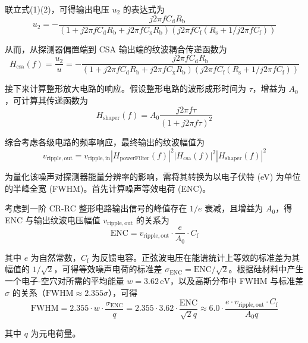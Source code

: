 \documentclass[12pt,fontset=fandol]{ctexart}
\begin{document}
联立式(1)(2)，可得输出电压 $u_2$ 的表达式为
\begin{equation}
u_2 = - \frac{j2\pi f C_{\mathrm{d}} R_{\mathrm{b}}}{(1 + j2\pi f C_{\mathrm{d}} R_{\mathrm{b}} + j2\pi f C_{\mathrm{x}} R_{\mathrm{b}})(j2\pi f C_{\mathrm{f}}(R_{\mathrm{s}} + 1/j2\pi f C_{\mathrm{f}}))}
\end{equation}

从而，从探测器偏置端到 CSA 输出端的纹波耦合传递函数为
\begin{equation}
H_{\mathrm{csa}}(f) = \frac{u_2}{u} = - \frac{j2\pi f C_{\mathrm{d}} R_{\mathrm{b}}}{(1 + j2\pi f C_{\mathrm{d}} R_{\mathrm{b}} + j2\pi f C_{\mathrm{x}} R_{\mathrm{b}})(j2\pi f C_{\mathrm{f}}(R_{\mathrm{s}} + 1/j2\pi f C_{\mathrm{f}}))}
\end{equation}

接下来计算整形放大电路的响应。假设整形电路的波形成形时间为 $\tau$，增益为 $A_0$，可计算其传递函数为
\begin{equation}
H_{\mathrm{shaper}}(f) = A_0 \frac{j2\pi f \tau}{(1 + j2\pi f \tau)^2}
\end{equation}

综合考虑各级电路的频率响应，最终输出的纹波幅值为
\begin{equation}
v_{\mathrm{ripple,out}} = v_{\mathrm{ripple,in}} |H_{\mathrm{powerFilter}}(f)|^2 |H_{\mathrm{csa}}(f)|^2 |H_{\mathrm{shaper}}(f)|^2
\end{equation}

\begin{graycommentblock}
为量化该噪声对探测器能量分辨率的影响，需将其转换为以电子伏特 (eV) 为单位的半峰全宽 (FWHM)\cite{ref14}。首先计算噪声等效电荷 (ENC)。

考虑到一阶 CR-RC 整形电路输出信号的峰值存在 $1/e$ 衰减，且增益为 $A_0$，得 ENC 与输出纹波电压幅值 $v_{\mathrm{ripple,out}}$ 的关系为
\begin{equation}
\mathrm{ENC} = v_{\mathrm{ripple,out}} \cdot \frac{e}{A_0} \cdot C_{\mathrm{f}}
\end{equation}

其中 $e$ 为自然常数，$C_{\mathrm{f}}$ 为反馈电容。正弦波电压在能谱统计上等效的标准差为其幅值的 $1/\sqrt{2}$，可得等效噪声电荷的标准差 $\sigma_{\mathrm{ENC}} = \mathrm{ENC}/\sqrt{2}$。根据硅材料中产生一个电子-空穴对所需的平均能量 $w = 3.62\,\mathrm{eV}$，以及高斯分布中 FWHM 与标准差 $\sigma$ 的关系（$\mathrm{FWHM} \approx 2.355\sigma$），可得
\begin{equation}
\mathrm{FWHM} = 2.355 \cdot w \cdot \frac{\sigma_{\mathrm{ENC}}}{q}
= 2.355 \cdot 3.62 \cdot \frac{\mathrm{ENC}}{\sqrt{2} q}
\approx 6.0 \cdot \frac{e \cdot v_{\mathrm{ripple,out}} \cdot C_{\mathrm{f}}}{A_0 q}
\end{equation}

其中 $q$ 为元电荷量。
\end{graycommentblock}
\end{document}
